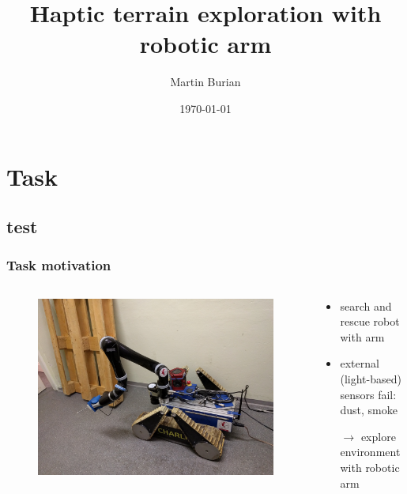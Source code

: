 \documentclass{beamer}
\title{Haptic terrain exploration with robotic arm}
\author{Martin Burian}
\date{\today}
\begin{document}
\begin{frame}
  \titlepage
\end{frame}

\section{Task}
\subsection{test}

\begin{frame}
  \frametitle{Task motivation}

  \begin{columns}
    \begin{column}{0.5\textwidth}
      \begin{figure}[htp]
        \centering
        \includegraphics[width=\textwidth]{photo/robot_exploring.jpg}
      \end{figure}
    \end{column}
  
    \begin{column}{0.5\textwidth}
      \begin{itemize}
      \item search and rescue robot with arm
      \item external (light-based) sensors fail: dust, smoke
      \item[\(\rightarrow\)] explore environment with robotic arm
      \end{itemize}
    \end{column}
  
  \end{columns}

\end{frame}
\end{document}
